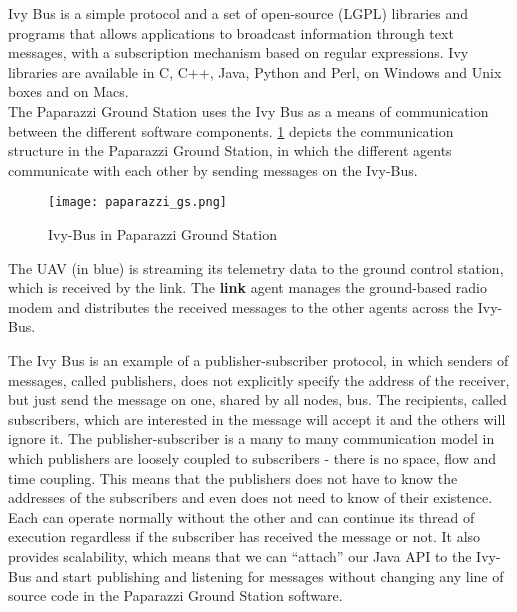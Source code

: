 Ivy Bus is a simple protocol and a set of open-source (LGPL) libraries and programs that allows applications to broadcast information through text messages, with a subscription mechanism based on regular expressions. 
Ivy libraries are available in C, C++, Java, Python and Perl, on Windows and Unix boxes and on Macs. \\

The Paparazzi Ground Station uses the Ivy Bus as a means of communication between the different software components. 
 \ref{fig:paparazziGS} depicts the communication structure in the Paparazzi Ground Station, in which the different agents communicate with each other by sending messages on the Ivy-Bus.

\begin{figure}[h!]
 \begin{center}
  \texttt{[image: paparazzi\_gs.png]}
 \end{center}
  \caption{Ivy-Bus in Paparazzi Ground Station\label{fig:paparazziGS}}
\end{figure}

The \gls{UAV} (in blue) is streaming its telemetry data to the ground control station, which is received by the link. The \textbf{link} agent manages the ground-based radio modem and distributes the received messages to the other agents across the Ivy-Bus.

The Ivy Bus is an example of a publisher-subscriber protocol, in which senders of messages, called publishers, does not  explicitly specify the address of the receiver, but just send the message on one, shared by all nodes, bus. The recipients, called subscribers, which are interested in the message will accept it and the others will ignore it. The publisher-subscriber is a many to many communication model in which publishers are loosely coupled to subscribers - there is no space, flow and time coupling. This means that the publishers does not have to know the addresses of the subscribers and even does not need to know of their existence. Each can operate normally without the other and can continue its thread of execution regardless if the subscriber has received the message or not. It also provides scalability, which means that we can “attach” our Java API to the Ivy-Bus and start publishing and listening for messages without changing any line of source code in the Paparazzi Ground Station software.

